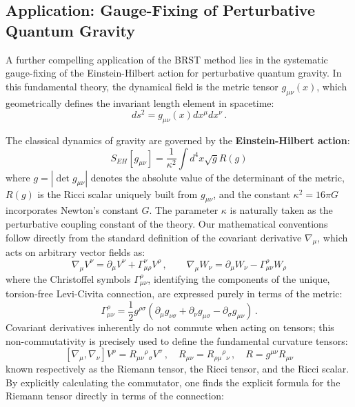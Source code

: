 \subsection{Application: Gauge-Fixing of Perturbative Quantum Gravity}

A further compelling application of the BRST method lies in the systematic gauge-fixing of the Einstein-Hilbert action for perturbative quantum gravity. In this fundamental theory, the dynamical field is the metric tensor \(g_{\mu\nu}(x)\), which geometrically defines the invariant length element in spacetime:
\begin{equation} \label{eq:line_element}
    ds^2 = g_{\mu\nu}(x)dx^\mu dx^\nu \, .
\end{equation}

The classical dynamics of gravity are governed by the \textbf{Einstein-Hilbert action}:
\begin{equation} \label{eq:einstein_hilbert}
    S_{EH}[g_{\mu\nu}] = \frac{1}{\kappa^2} \int d^4x \sqrt{g} R(g)
\end{equation}
where \(g = |\det g_{\mu\nu}|\) denotes the absolute value of the determinant of the metric, \(R(g)\) is the Ricci scalar uniquely built from \(g_{\mu\nu}\), and the constant \(\kappa^2 = 16\pi G\) incorporates Newton's constant \(G\). The parameter \(\kappa\) is naturally taken as the perturbative coupling constant of the theory. Our mathematical conventions follow directly from the standard definition of the covariant derivative \(\nabla_\mu\), which acts on arbitrary vector fields as:
\[
    \nabla_\mu V^\nu = \partial_\mu V^\nu + \Gamma^\nu_{\mu\rho} V^\rho \, , \qquad \nabla_\mu W_\nu = \partial_\mu W_\nu - \Gamma^\rho_{\mu\nu} W_\rho
\]
where the Christoffel symbols \(\Gamma^\rho_{\mu\nu}\), identifying the components of the unique, torsion-free Levi-Civita connection, are expressed purely in terms of the metric:
\[
    \Gamma^\rho_{\mu\nu} = \frac{1}{2}g^{\rho\sigma}(\partial_\mu g_{\nu\sigma} + \partial_\nu g_{\mu\sigma} - \partial_\sigma g_{\mu\nu}) \, .
\]
Covariant derivatives inherently do not commute when acting on tensors; this non-commutativity is precisely used to define the fundamental curvature tensors:
\begin{equation} \label{eq:curvature_tensors}
    [\nabla_\mu, \nabla_\nu]V^\rho = R_{\mu\nu}{}^\rho{}_\sigma V^\sigma \, , \quad R_{\mu\nu} = R_{\rho\mu}{}^\rho{}_\nu \, , \quad R = g^{\mu\nu}R_{\mu\nu}
\end{equation}
known respectively as the Riemann tensor, the Ricci tensor, and the Ricci scalar. By explicitly calculating the commutator, one finds the explicit formula for the Riemann tensor directly in terms of the connection:

